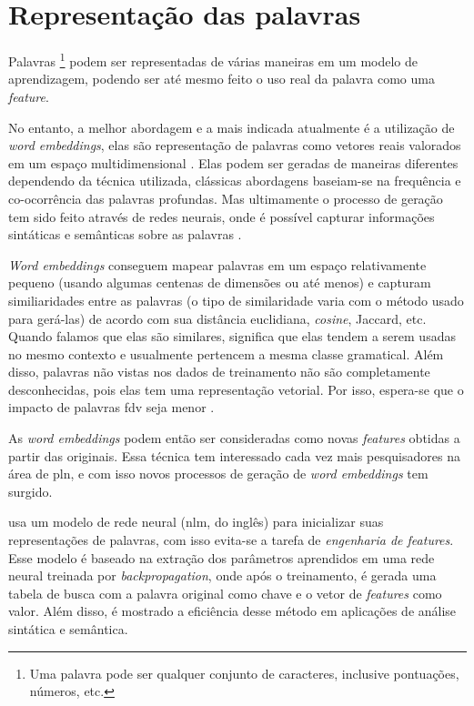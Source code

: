 \section{Representação das palavras}\label{sec:representacaodaspalavras}

Palavras \footnote{Uma palavra pode ser qualquer conjunto de caracteres, inclusive pontuações, números, etc.} podem ser representadas de várias maneiras em um modelo de aprendizagem, podendo ser até mesmo feito o uso real da palavra como uma \textit{feature}.

No entanto, a melhor abordagem e a mais indicada atualmente é a utilização de \textit{word embeddings}, elas são representação de palavras como vetores reais valorados em um espaço multidimensional \cite{turian2010word}. Elas podem ser geradas de maneiras diferentes dependendo da técnica utilizada, clássicas abordagens baseiam-se na frequência e co-ocorrência das palavras profundas. Mas ultimamente o processo de geração tem sido feito através de redes neurais, onde é possível capturar informações sintáticas e semânticas sobre as palavras \cite{collobert2011natural}.

\textit{Word embeddings} conseguem mapear palavras em um espaço relativamente pequeno (usando algumas centenas de dimensões ou até menos) e capturam similiaridades entre as palavras (o tipo de similaridade varia com o método usado para gerá-las) de acordo com sua distância euclidiana, \textit{cosine}, Jaccard, etc. Quando falamos que elas são similares, significa que elas tendem a serem usadas no mesmo contexto e usualmente pertencem a mesma classe gramatical. Além disso, palavras não vistas nos dados de treinamento não são completamente desconhecidas, pois elas tem uma representação vetorial. Por isso, espera-se que o impacto de palavras \ac{fdv} seja menor \cite{fonseca2015evaluating}.

As \textit{word embeddings} podem então ser consideradas como novas \textit{features} obtidas a partir das originais. Essa técnica tem interessado cada vez mais pesquisadores na área de \ac{pln}, e com isso novos processos de geração de \textit{word embeddings} tem surgido.

 usa um modelo de rede neural (\ac{nlm}, do inglês) para inicializar suas representações de palavras, com isso evita-se a tarefa de \textit{engenharia de features}. Esse modelo é baseado na extração dos parâmetros aprendidos em uma rede neural treinada por \textit{backpropagation}, onde após o treinamento, é gerada uma tabela de busca com a palavra original como chave e o vetor de \textit{features} como valor. Além disso, é mostrado a eficiência desse método em aplicações de análise sintática e semântica.

